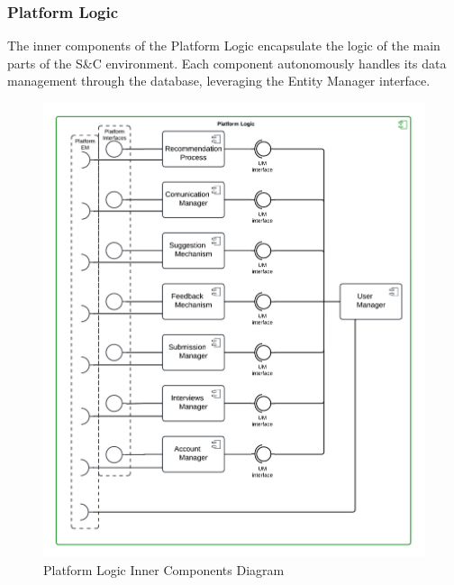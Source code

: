 \subsubsection{Platform Logic}
The inner components of the Platform Logic encapsulate the logic of the main parts of the S\&C environment. Each component autonomously handles its data management through the database, leveraging the Entity Manager interface.
\clearpage
\begin{figure}[H]
    \centering
    \includegraphics[width=0.8\linewidth]{Latex/Images/DD/Component1.png}
    \caption{Platform Logic Inner Components Diagram}
    \label{fig:PlatformComponents}
\end{figure}

